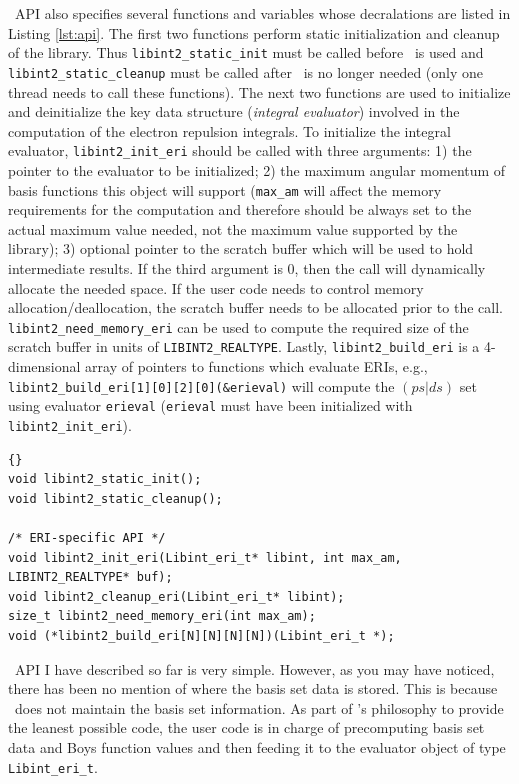 \documentclass[10pt]{article}
\begin{document}
\LIBINT\ API also specifies several functions and variables whose decralations
are listed in Listing \ref{lst:api}.
The first two functions perform static initialization and cleanup of the library.
Thus {\tt libint2\_static\_init} must be called before \LIBINT\ is used and
{\tt libint2\_static\_cleanup} must be called after \LIBINT\ is no longer needed (only one thread needs to call these functions).
The next two functions are used to initialize and deinitialize the key data
structure ({\em integral evaluator}) involved in the computation of the electron repulsion integrals.
To initialize the integral evaluator, {\tt libint2\_init\_eri} should be called with three arguments:
1) the pointer to the evaluator to be initialized; 2) the maximum angular momentum
of basis functions this object will support ({\tt max\_am} will affect the memory requirements
for the computation and therefore should be always set to the actual maximum value needed,
not the maximum value supported by the library); 3) optional pointer to the scratch buffer
which will be used to hold intermediate results. If the third argument is 0, then
the call will dynamically allocate the needed space. If the user code needs to control
memory allocation/deallocation, the scratch buffer needs to be allocated prior to the call.
{\tt libint2\_need\_memory\_eri} can be used to compute the required size of
the scratch buffer in units of {\tt LIBINT2\_REALTYPE}. Lastly, {\tt libint2\_build\_eri} is a 4-dimensional
array of pointers to functions which evaluate ERIs, e.g., {\tt libint2\_build\_eri[1][0][2][0](\&erieval)}
will compute the $(ps|ds)$ set using evaluator {\tt erieval} ({\tt erieval} must have been initialized
with {\tt libint2\_init\_eri}).

\begin{lstlisting}[label=lst:api,caption=\LIBINT\ API  functions and data.
{\tt N = LIBINT2\_MAX\_AM\_ERI + 1}.]{}
void libint2_static_init();
void libint2_static_cleanup();

/* ERI-specific API */
void libint2_init_eri(Libint_eri_t* libint, int max_am, LIBINT2_REALTYPE* buf);
void libint2_cleanup_eri(Libint_eri_t* libint);
size_t libint2_need_memory_eri(int max_am);
void (*libint2_build_eri[N][N][N][N])(Libint_eri_t *);
\end{lstlisting}

\LIBINT\ API I have described so far is very simple. However, as you may have noticed, there has been no mention of
where the basis set data is stored. This is because \LIBINT\ does not maintain the basis set information.
As part of \LIBINT 's philosophy to provide the leanest possible code, the user code
is in charge of precomputing basis set data and Boys function values and then feeding it to the evaluator object
of type {\tt Libint\_eri\_t}.
\end{document}
